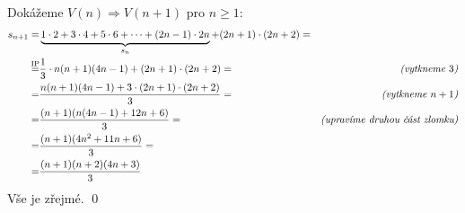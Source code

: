 \documentclass{article}
\begin{document}
 Dokážeme $V(n) \Rightarrow V(n+1)$ pro $n\geq1$:
\begin{align*}
s_{n+1} = & \underbrace{1\cdot2 + 3\cdot4 + 5\cdot6 + \cdots + (2n-1) \cdot 2n}_{s_n} + (2n+1) \cdot (2n+2) = & \\
 \IP{=} & \frac{1}{3} \cdot n(n+1)(4n-1) + (2n+1) \cdot (2n+2) = & \describe{vytkneme $3$} \\
      = & \frac{n(n+1)(4n-1) + 3 \cdot (2n+1) \cdot (2n+2)}{3} = & \describe{vytkneme $n+1$} \\
      = & \frac{(n+1)(n(4n-1) + 12n + 6)}{3} = & \describe{upravíme druhou část zlomku} \\
      = & \frac{(n+1)(4n^2 + 11n + 6)}{3} = & \\
      = & \frac{(n+1)(n+2)(4n+3)}{3}
\end{align*}
 Vše je zřejmé. \qed
\end{document}
